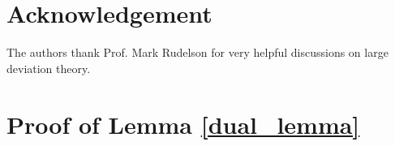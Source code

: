 \documentclass[journal,11pt,draftcls,onecolumn]{IEEEtran}
\def\bS{ {\mathbf{S}} }
\def\bX{ {\mathbf{X}} }
\def\bY{ {\mathbf{Y}} }
\newtheorem{theorem}{Theorem}
\begin{document}
\section*{Acknowledgement}
The authors thank Prof. Mark Rudelson for very helpful discussions on large deviation theory.


\appendices

\section{Proof of Lemma \ref{dual_lemma}}


%
\end{document}
